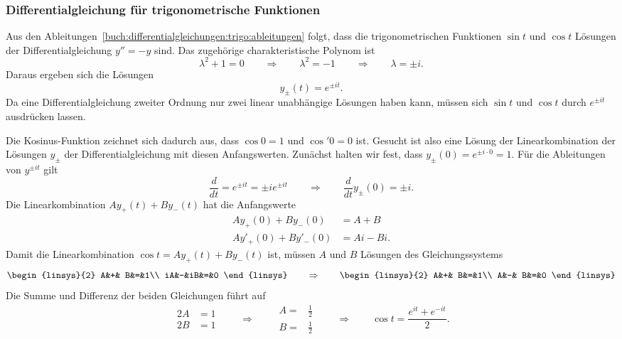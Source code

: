 \subsubsection{Differentialgleichung für trigonometrische Funktionen}
Aus den Ableitungen~\eqref{buch:differentialgleichungen:trigo:ableitungen}
folgt, dass die trigonometrischen Funktionen $\sin t $ und $\cos t$
Lösungen der Differentialgleichung $y''=-y$ sind.
Das zugehörige charakteristische Polynom ist 
\[
\lambda^2+1=0
\qquad\Rightarrow\qquad
\lambda^2=-1
\qquad\Rightarrow\qquad
\lambda=\pm i.
\]
Daraus ergeben sich die Lösungen
\[
y_{\pm}(t) = e^{\pm i t}.
\]
Da eine Differentialgleichung zweiter Ordnung nur zwei linear unabhängige
Lösungen haben kann, müssen sich $\sin t$ und $\cos t$ durch
$e^{\pm it}$ ausdrücken lassen.

Die Kosinus-Funktion zeichnet sich dadurch aus, dass $\cos 0=1$ und
$\cos' 0=0$ ist.
Gesucht ist also eine Lösung der Linearkombination der Lösungen
$y_{\pm}$ der Differentialgleichung mit diesen Anfangswerten.
Zunächst halten wir fest, dass $y_{\pm}(0)=e^{\pm i\cdot 0}=1$.
Für die Ableitungen von $y^{\pm it}$ gilt
\[
\frac{d}{dt}
=
e^{\pm i t}
=
\pm ie^{\pm i t}
\qquad\Rightarrow\qquad
\frac{d}{dt}y_{\pm}(0) = \pm i.
\]
Die Linearkombination $Ay_+(t)+By_-(t)$ hat die Anfangswerte
\begin{align*}
Ay_+(0)+By_-(0)&=A+B\\
Ay'_+(0)+By'_-(0)&=Ai-Bi.
\end{align*}
Damit die Linearkombination $\cos t=Ay_+(t)+By_-(t)$ ist, müssen
$A$ und $B$ Lösungen des Gleichungssystems
\[
\begin{linsys}{2}
 A&+& B&=&1\\
iA&-&iB&=&0
\end{linsys}
\qquad\Rightarrow\qquad
\begin{linsys}{2}
 A&+& B&=&1\\
 A&-& B&=&0
\end{linsys}
\]
Die Summe und Differenz der beiden Gleichungen führt auf
\[
\begin{aligned}
2A&=1\\
2B&=1
\end{aligned}
\qquad\Rightarrow\qquad
\begin{aligned}
A=&\textstyle\frac12\\
B=&\textstyle\frac12
\end{aligned}
\qquad\Rightarrow\qquad
\cos t = \frac{e^{it}+e^{-it}}{2}.
\]

